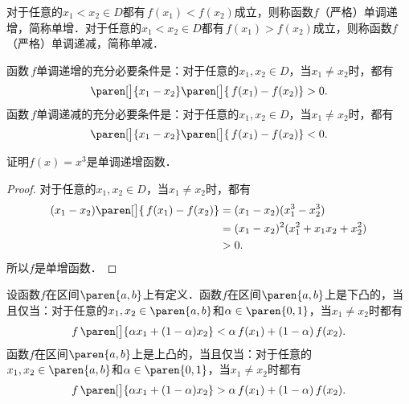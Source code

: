 \begin{definition}
  \label{defn:funcmono}
  对于任意的\(x_1 < x_2 \in D\)都有\(\,f(x_1) < f(x_2)\)成立，则称函数\(f\)（严格）单调递增，简称单增．对于任意的\(x_1 < x_2 \in D\)都有\(\,f(x_1) > f(x_2)\)成立，则称函数\(f\)（严格）单调递减，简称单减．
\end{definition}

\begin{theorem*}
  函数\(\,f\)单调递增的充分必要条件是：对于任意的\(x_1, x_2 \in D\)，当\(x_1 \ne x_2\)时，都有
  \begin{equation*}
    \paren[\big]{x_1 - x_2}\paren[\big]{\,f(x_1) - f(x_2)} > 0.
  \end{equation*}
  函数\(\,f\)单调递减的充分必要条件是：对于任意的\(x_1, x_2 \in D\)，当\(x_1 \ne x_2\)时，都有
  \begin{equation*}
    \paren[\big]{x_1 - x_2}\paren[\big]{\,f(x_1) - f(x_2)} < 0.
  \end{equation*}
\end{theorem*}

\begin{example*}
  证明\(f(x) = x^3\)是单调递增函数．

  \begin{proof}
    对于任意的\(x_1, x_2 \in D\)，当\(x_1 \ne x_2\)时，都有
    \[
      \begin{split}
        (x_1 - x_2) \paren[\big]{\,f(x_1) - f(x_2)}
        &= (x_1 - x_2) (x_1^3 - x_2^3) \\
        &= (x_1 - x_2)^2 (x_1^2 + x_1 x_2 + x_2^2) \\
        &> 0.
      \end{split}
    \]
    所以\(f\)是单增函数．
  \end{proof}
\end{example*}

\begin{definition*}
  设函数\(f\)在区间\(\paren{a,b}\)上有定义．函数\(f\)在区间\(\paren{a,b}\)上是下凸的，当且仅当：对于任意的\(x_1, x_2 \in \paren{a,b}\)和\(\alpha \in \paren{0,1}\)，当\(x_1 \ne x_2\)时都有
  \[
    f\,\paren[\big]{\alpha x_1 + (1-\alpha) x_2} < \alpha\,f(x_1) + (1-\alpha)\,f(x_2).
  \]
  函数\(f\)在区间\(\paren{a,b}\)上是上凸的，当且仅当：对于任意的\(x_1, x_2 \in \paren{a,b}\)和\(\alpha \in \paren{0,1}\)，当\(x_1 \ne x_2\)时都有
  \[
    f\,\paren[\big]{\alpha x_1 + (1-\alpha) x_2} > \alpha\,f(x_1) + (1-\alpha)\,f(x_2).
  \]
\end{definition*}

